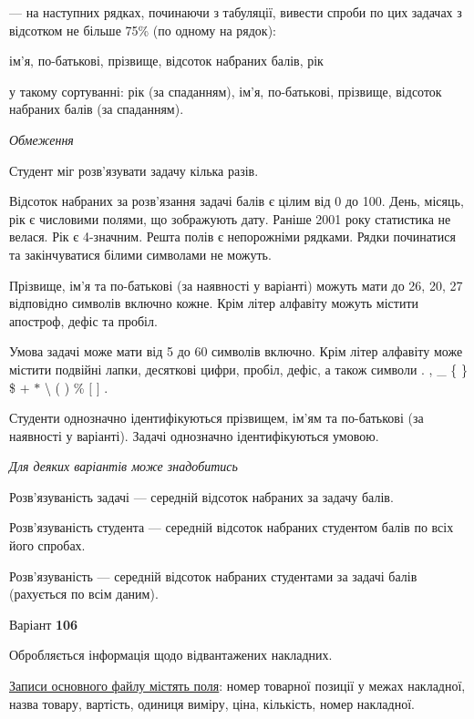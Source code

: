 \documentclass[11pt, ukrainian]{article}
\begin{document}
{\noindent}--- на наступних рядках, починаючи з табуляції, вивести спроби по цих задачах з відсотком не більше 75\% (по одному на рядок):\par
ім’я, по-батькові, прізвище, відсоток набраних балів, рік

{\noindent}у такому сортуванні: рік (за спаданням), ім’я, по-батькові, прізвище, відсоток набраних балів (за спаданням).


\bigskip\textit{Обмеження}

Студент міг розв’язувати задачу кілька разів.

Відсоток набраних за розв’язання задачі балів є цілим від 0 до 100.
День, місяць, рік є числовими полями, що зображують дату.
Раніше 2001 року статистика не велася. Рік є 4-значним.
Решта полів є непорожніми рядками.
Рядки починатися та закінчуватися білими символами не можуть.

Прізвище, ім’я та по-батькові (за наявності у варіанті) можуть мати до 26, 20, 27 відповідно символів включно кожне. 
Крім літер алфавіту можуть містити апостроф, дефіс та пробіл.

Умова задачі може мати від 5 до 60 символів включно.
Крім літер алфавіту може містити подвійні лапки, десяткові цифри, пробіл, дефіс,
а також символи . , \_ \{ \} \$ $+$ $*$ {\textbackslash} ( ) \% $[$ $]$ .

Студенти однозначно ідентифікуються прізвищем, ім’ям та по-батькові (за наявності у варіанті).
Задачі однозначно ідентифікуються умовою.

\bigskip\textit{Для деяких варіантів може знадобитись}

Розв'язуваність задачі --- середній відсоток набраних за задачу балів.

Розв'язуваність студента --- середній відсоток набраних студентом балів по всіх його спробах.

Розв'язуваність --- середній відсоток набраних студентами за задачі балів (рахується по всім даним).




\par
\newpage
{\center Варіант  \No \textbf { 106 }\par}
\bigskip
Обробляється інформація щодо відвантажених накладних.

\underline{Записи основного файлу містять поля}: номер товарної позиції у межах накладної, назва товару, вартість, одиниця виміру, ціна, кількість, номер накладної.
\end{document}
